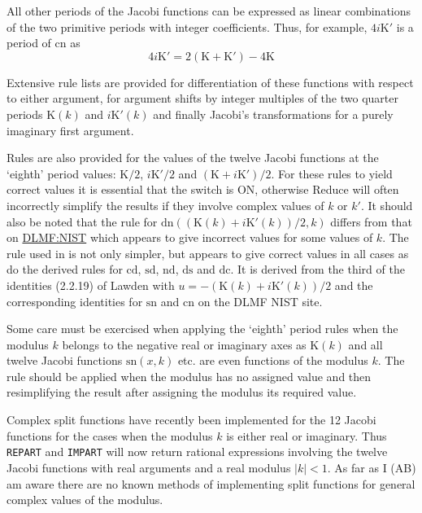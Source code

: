 All other periods of the Jacobi functions can be expressed as linear
combinations of the two primitive periods with integer coefficients.
Thus, for example, $4i\mathrm{K}'$ is a period of $\mathrm{cn}$ as
\[4i\mathrm{K}' = 2(\mathrm{K}+\mathrm{K}') -4\mathrm{K}\]

Extensive rule lists are provided for differentiation of these functions with
respect to either argument, for argument shifts by integer multiples of the
two quarter periods $\mathrm{K}(k)$ and $i\mathrm{K}'(k)$ and finally
Jacobi's transformations for a purely imaginary first argument.

Rules are also provided for the values of the twelve Jacobi functions at the
`eighth' period values: $\mathrm{K}/2$, $i\mathrm{K}'/2$ and
$(\mathrm{K}+i\mathrm{K}')/2$. For these rules to yield correct values it
is essential that the switch  is ON, otherwise Reduce will
often incorrectly simplify the results if they involve complex values of $k$ or
$k'$. It should also be noted that the rule for
$\mathrm{dn}((\mathrm{K}(k)+i\mathrm{K}'(k))/2, k)$ differs from that on
\href{https://dlmf.nist.gov/22.5#i}{DLMF:NIST} which appears to give incorrect
values for some values of $k$. The rule used in \REDUCE is not only simpler,
but appears to give correct values in all cases as do the derived rules for
$\mathrm{cd}$, $\mathrm{sd}$, $\mathrm{nd}$, $\mathrm{ds}$ and $\mathrm{dc}$.
It is derived from the third of the identities (2.2.19) of Lawden
\cite{Lawden:89} with $u =-(\mathrm{K}(k)+i\mathrm{K}'(k))/2$ and
the corresponding identities for $\mathrm{sn}$ and $\mathrm{cn}$ on the
DLMF NIST site.

Some care must be exercised when applying the `eighth' period rules when
the modulus $k$ belongs to the negative real or imaginary axes as
$\mathrm{K}(k)$ and all twelve Jacobi functions $\mathrm{sn}(x,k)$ etc. are
even functions of the modulus $k$. The rule should be applied when the modulus
has no assigned value and then resimplifying the result after assigning the
modulus its required value.

Complex split functions have recently been implemented for the 12 Jacobi
functions for the cases when the modulus $k$ is either real or imaginary.
Thus \texttt{REPART} and \texttt{IMPART} will now return rational expressions
involving the twelve Jacobi functions with real arguments and a real modulus
$|k|<1$. As far as I (AB) am aware there are no known methods of implementing
split functions for general complex values of the modulus.

